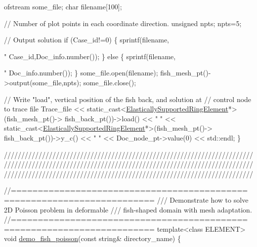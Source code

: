 \begin{DoxyCodeInclude}
{ ofstream some\_file;
 \textcolor{keywordtype}{char} filename[100];

 \textcolor{comment}{// Number of plot points in each coordinate direction.}
 \textcolor{keywordtype}{unsigned} npts;
 npts=5; 


 \textcolor{comment}{// Output solution }
 \textcolor{keywordflow}{if} (Case\_id!=0)
  \{
   sprintf(filename,\textcolor{stringliteral}{"%
           Case\_id,Doc\_info.number());
  \}
 \textcolor{keywordflow}{else}
  \{
   sprintf(filename,\textcolor{stringliteral}{"%
           Doc\_info.number());
  \}
 some\_file.open(filename);
 fish\_mesh\_pt()->output(some\_file,npts);
 some\_file.close();

 \textcolor{comment}{// Write "load", vertical position of the fish back, and solution at }
 \textcolor{comment}{// control node to trace file}
 Trace\_file 
  << \textcolor{keyword}{static\_cast<}\hyperlink{classoomph_1_1ElasticallySupportedRingElement}{ElasticallySupportedRingElement}*\textcolor{keyword}{>}(fish\_mesh\_pt()->
                                          fish\_back\_pt())->load()
  << \textcolor{stringliteral}{" "}
  << \textcolor{keyword}{static\_cast<}\hyperlink{classoomph_1_1ElasticallySupportedRingElement}{ElasticallySupportedRingElement}*\textcolor{keyword}{>}(fish\_mesh\_pt()->
                                          fish\_back\_pt())->y\_c()
  << \textcolor{stringliteral}{" "} << Doc\_node\_pt->value(0) << std::endl;
\}

 




\textcolor{comment}{}
\textcolor{comment}{////////////////////////////////////////////////////////////////////////}
\textcolor{comment}{////////////////////////////////////////////////////////////////////////}
\textcolor{comment}{////////////////////////////////////////////////////////////////////////}
\textcolor{comment}{}




\textcolor{comment}{//========================================================================}\textcolor{comment}{}
\textcolor{comment}{/// Demonstrate how to solve 2D Poisson problem in deformable}
\textcolor{comment}{/// fish-shaped domain with mesh adaptation.}
\textcolor{comment}{}\textcolor{comment}{//========================================================================}
\textcolor{keyword}{template}<\textcolor{keyword}{class} ELEMENT>
\textcolor{keywordtype}{void} \hyperlink{algebraic__free__boundary__poisson_8cc_abb923e967929c29b3a4fa1693604952a}{demo\_fish\_poisson}(\textcolor{keyword}{const} \textcolor{keywordtype}{string}& directory\_name)
\{

}}}
\end{DoxyCodeInclude}
